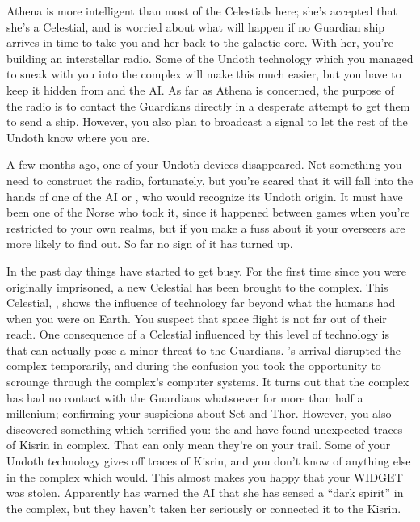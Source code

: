 \documentclass[char]{guardians}
\begin{document}
Athena is more intelligent than most of the Celestials here; she's accepted that she's a Celestial, and is worried about what will happen if no Guardian ship arrives in time to take you and her back to the galactic core. With her, you're building an interstellar radio. Some of the Undoth technology which you managed to sneak with you into the complex will make this much easier, but you have to keep it hidden from \cJascha{} and the AI. As far as Athena is concerned, the purpose of the radio is to contact the Guardians directly in a desperate attempt to get them to send a ship. However, you also plan to broadcast a signal to let the rest of the Undoth know where you are.


A few months ago, one of your Undoth devices disappeared. Not something you need to construct the radio, fortunately, but you're scared that it will fall into the hands of one of the AI or \cJascha{}, who would recognize its Undoth origin. It must have been one of the Norse who took it, since it happened between games when you're restricted to your own realms, but if you make a fuss about it your overseers are more likely to find out. So far no sign of it has turned up.

In the past day things have started to get busy. For the first time since you were originally imprisoned, a new Celestial has been brought to the complex. This Celestial, \cUnity{}, shows the influence of technology far beyond what the humans had when you were on Earth. You suspect that space flight is not far out of their reach. One consequence of a Celestial influenced by this level of technology is that \cUnity{\they} can actually pose a minor threat to the Guardians. \cUnity{}'s arrival disrupted the complex temporarily, and during the confusion you took the opportunity to scrounge through the complex's computer systems. It turns out that the complex has had no contact with the Guardians whatsoever for more than half a millenium; confirming your suspicions about Set and Thor. However, you also discovered something which terrified you: the \cWarden{} and \cCaretaker{} have found unexpected traces of Kisrin in complex. That can only mean they're on your trail. Some of your Undoth technology gives off traces of Kisrin, and you don't know of anything else in the complex which would. This almost makes you happy that your WIDGET was stolen. Apparently \cAmaterasu{} has warned the AI that she has sensed a ``dark spirit'' in the complex, but they haven't taken her seriously or connected it to the Kisrin.
\end{document}
